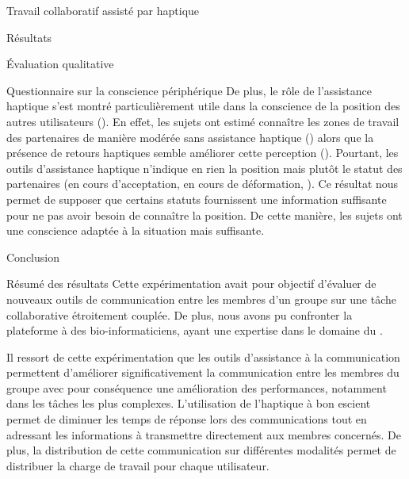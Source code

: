 \documentclass[myfrancais,ngerman,english,french]{mythesis}
\begin{document}
\begin{mychapter}{Travail collaboratif assisté par haptique}
\begin{mysection}{Résultats}
\begin{mysubsection}{Évaluation qualitative}
\begin{mysubsubsection}{Questionnaire sur la conscience périphérique}
					De plus, le rôle de l'assistance haptique s'est montré particulièrement utile dans la conscience de la position des autres utilisateurs ().
					En effet, les sujets ont estimé connaître les zones de travail des partenaires de manière modérée sans assistance haptique () alors que la présence de retours haptiques semble améliorer cette perception ().
					Pourtant, les outils d'assistance haptique n'indique en rien la position mais plutôt le statut des partenaires (en cours d'acceptation, en cours de déformation, \myetc).
					Ce résultat nous permet de supposer que certains statuts fournissent une information suffisante pour ne pas avoir besoin de connaître la position.
					De cette manière, les sujets ont une conscience adaptée à la situation mais suffisante.
				\end{mysubsubsection}
			\end{mysubsection}
		\end{mysection}
		\begin{mysection}{Conclusion}
			\begin{mysubsection}{Résumé des résultats}
				Cette expérimentation avait pour objectif d'évaluer de nouveaux outils de communication entre les membres d'un groupe sur une tâche collaborative étroitement couplée.
				De plus, nous avons pu confronter la plateforme \myShaddock à des bio-informaticiens, ayant une expertise dans le domaine du .

				Il ressort de cette expérimentation que les outils d'assistance à la communication permettent d'améliorer significativement la communication entre les membres du groupe avec pour conséquence une amélioration des performances, notamment dans les tâches les plus complexes.
				L'utilisation de l'haptique à bon escient permet de diminuer les temps de réponse lors des communications tout en adressant les informations à transmettre directement aux membres concernés.
				De plus, la distribution de cette communication sur différentes modalités permet de distribuer la charge de travail pour chaque utilisateur.


\end{mysubsection}
\end{mysection}
\end{mychapter}
\end{document}
